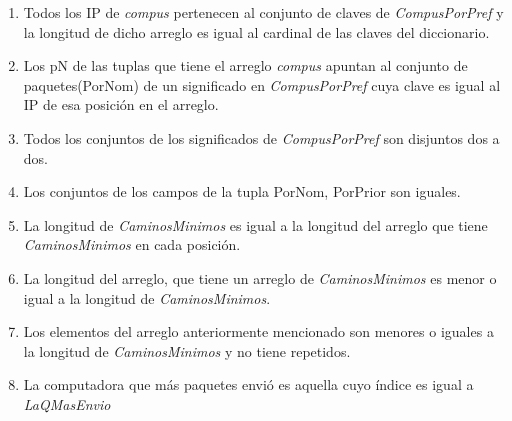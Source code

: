 \begin{enumerate}
	\item Todos los IP de \textit{compus} pertenecen al conjunto de claves de \textit{CompusPorPref} y la longitud de dicho arreglo es igual al cardinal de las claves del diccionario. 
	\item Los pN de las tuplas que tiene el arreglo \textit{compus} apuntan al conjunto de paquetes(PorNom) de un significado en \textit{CompusPorPref} cuya clave es igual al IP de esa posición en el arreglo.
	\item Todos los conjuntos de los significados de \textit{CompusPorPref} son disjuntos dos a dos.
  \item Los conjuntos de los campos de la tupla PorNom, PorPrior son iguales.
  \item La longitud de \textit{CaminosMinimos} es igual a la longitud del arreglo que tiene \textit{CaminosMinimos} en cada posición.
  \item La longitud del arreglo, que tiene un arreglo de \textit{CaminosMinimos} es menor o igual a la longitud de \textit{CaminosMinimos}.
  \item Los elementos del arreglo anteriormente mencionado son menores o iguales a la longitud de \textit{CaminosMinimos} y no tiene repetidos.
  \item La computadora que más paquetes envió es aquella cuyo índice es igual a \textit{LaQMasEnvio}

\end{enumerate}




